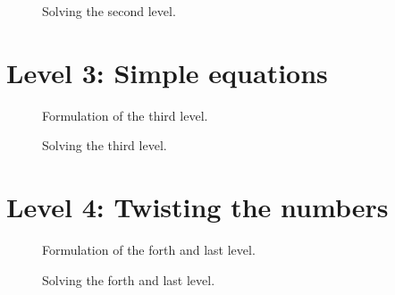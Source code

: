 \begin{figure}[h!]
	\label{fig:solved_level2}
	\caption{Solving the second level.}
\end{figure}

\section{Level 3: Simple equations}

\begin{figure}[h!]
	\label{fig:intro_level3}
	\caption{Formulation of the third level.}
\end{figure}

\begin{figure}[h!]
	\label{fig:solved_level3}
	\caption{Solving the third level.}
\end{figure}


\section{Level 4: Twisting the numbers}

\begin{figure}[h!]
	\label{fig:intro_level4}
	\caption{Formulation of the forth and last level.}
\end{figure}

\begin{figure}[h!]
	\label{fig:solved_level4}
	\caption{Solving the forth and last level.}
\end{figure}